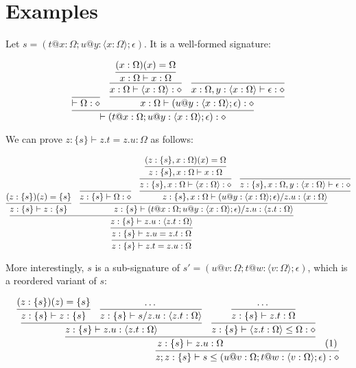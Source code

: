 \documentclass[twoside]{article}
\begin{document}
\section{Examples}
\label{examples}

Let $s = (t@x:\Omega; u@y:\langle x:\Omega\rangle; \epsilon)$. It is a well-formed signature:

\begin{displaymath}
\infer{\vdash (t@x:\Omega; u@y:\langle x:\Omega\rangle; \epsilon) : \diamond}{
  \infer{\vdash \Omega : \diamond}{}
  &
  \infer{x:\Omega \vdash (u@y:\langle x:\Omega\rangle;\epsilon) : \diamond}{
    \infer{x:\Omega \vdash \langle x:\Omega\rangle : \diamond}{
      \infer{x:\Omega \vdash x : \Omega}{
        (x:\Omega)(x) = \Omega
      }
    }
    &
    \infer{x:\Omega,y:\langle x:\Omega\rangle \vdash \epsilon : \diamond}{}
  }
}
\end{displaymath}

We can prove $z:\{s\} \vdash z.t = z.u : \Omega$ as follows:

\begin{displaymath}
\infer{z:\{s\} \vdash z.t = z.u : \Omega}{
  \infer{z:\{s\} \vdash z.u = z.t : \Omega}{
    \infer{z:\{s\} \vdash z.u : \langle z.t:\Omega\rangle}{
      \infer{z:\{s\} \vdash z : \{s\}}{
        (z:\{s\})(z) = \{s\}
      }
      &
      \infer{z:\{s\} \vdash (t@x:\Omega; u@y:\langle x:\Omega\rangle; \epsilon)/z.u : \langle z.t:\Omega\rangle}{
        \infer{z:\{s\} \vdash \Omega : \diamond}{}
	&
	\infer{z:\{s\},x:\Omega \vdash (u@y:\langle x:\Omega\rangle;\epsilon)/z.u : \langle x:\Omega\rangle}{
	  \infer{z:\{s\},x:\Omega \vdash \langle x:\Omega\rangle : \diamond}{
	    \infer{z:\{s\},x:\Omega \vdash x : \Omega}{
	      (z:\{s\},x:\Omega)(x) = \Omega
	    }
	  }
	  &
	  \infer{z:\{s\},x:\Omega,y:\langle x:\Omega\rangle \vdash \epsilon : \diamond}{}
	}
      }
    }
  }
}
\end{displaymath}

More interestingly, $s$ is a sub-signature of $s' = (u@v:\Omega;t@w:\langle v:\Omega\rangle;\epsilon)$, which is a reordered variant of $s$:

\begin{displaymath}
\infer{z;z:\{s\} \vdash s \leq (u@v:\Omega;t@w:\langle v:\Omega\rangle;\epsilon) : \diamond}{
  \infer{z:\{s\} \vdash z.u : \Omega}{
    \infer{z:\{s\} \vdash z.u : \langle z.t:\Omega\rangle}{
      \infer{z:\{s\} \vdash z : \{s\}}{
        (z:\{s\})(z) = \{s\}
      }
      &
      \infer{z:\{s\} \vdash s/z.u : \langle z.t:\Omega\rangle}{
        \cdots
      }
    }
    &
    \infer{z:\{s\} \vdash \langle z.t:\Omega\rangle \leq \Omega : \diamond}{
      \infer{z:\{s\} \vdash z.t : \Omega}{
	\cdots
      }
    }
  }
  &
  (1)
}
\end{displaymath}
\end{document}
